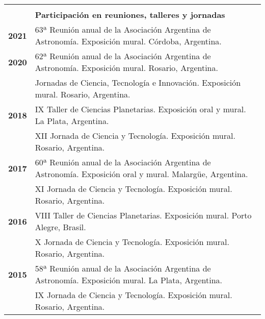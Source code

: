 \documentclass[12pt,a4paper]{article}
\begin{document}
\begin{longtable}[t]{r p{12cm}}

  & \\
  & \textbf{Participación en reuniones, talleres y jornadas} \\
 \cline{2-2}
 \textbf{2021} & 63ª Reunión anual de la Asociación Argentina de Astronomía. Exposición mural. Córdoba, Argentina. \\
 \textbf{2020} & 62ª Reunión anual de la Asociación Argentina de Astronomía. Exposición mural. Rosario, Argentina. \\
               & Jornadas de Ciencia, Tecnología e Innovación. Exposición mural. Rosario, Argentina. \\
 \textbf{2018} & IX Taller de Ciencias Planetarias. Exposición oral y mural. La Plata, Argentina. \\
               & XII Jornada de Ciencia y Tecnología. Exposición mural. Rosario, Argentina. \\
 \textbf{2017} & 60ª Reunión anual de la Asociación Argentina de Astronomía. Exposición oral y mural. Malargüe, Argentina. \\
               & XI Jornada de Ciencia y Tecnología. Exposición mural. Rosario, Argentina. \\
 \textbf{2016} & VIII Taller de Ciencias Planetarias. Exposición mural. Porto Alegre, Brasil. \\
               & X Jornada de Ciencia y Tecnología. Exposición mural. Rosario, Argentina. \\
 \textbf{2015} & 58ª Reunión anual de la Asociación Argentina de Astronomía. Exposición mural. La Plata, Argentina. \\
               & IX Jornada de Ciencia y Tecnología. Exposición mural. Rosario, Argentina. \\


\end{longtable}
\end{document}
